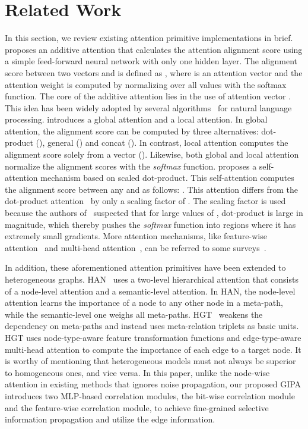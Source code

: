 \documentclass[runningheads]{llncs}
\newcommand{\model}{GIPA\xspace}
\begin{document}
\section{Related Work}
In this section, we review existing attention primitive implementations in brief.
\cite{bahdanau2014neural} proposes an additive attention that calculates the attention alignment score using a simple feed-forward neural network with only one hidden layer.
The alignment score  between two vectors  and  is defined as
, 
where  is an attention vector and the attention weight  is computed by normalizing  over all  values with the softmax function.
The core of the additive attention lies in the use of attention vector .
This idea has been widely adopted by several algorithms~\cite{yang2016hierarchical,pavlopoulos2017deeper} for natural language processing.
\cite{luong2015effective} introduces a global attention and a local attention.
In global attention, the alignment score can be computed by three alternatives: dot-product (), general () and concat ().
In contrast, local attention computes the alignment score solely from a vector ().
Likewise, both global and local attention normalize the alignment scores with the \textit{softmax} function.
\cite{vaswani2017attention} proposes a self-attention mechanism based on scaled dot-product.
This self-attention computes the alignment score between any  and  as follows: 
. 
This attention differs from the dot-product attention~\cite{luong2015effective} by only a scaling factor of .
The scaling factor is used because the authors of~\cite{vaswani2017attention} suspected that for large values of , dot-product is large in magnitude, which thereby pushes the \textit{softmax} function into regions where it has extremely small gradients.
More attention mechanisms, like feature-wise attention~\cite{FeatureAtt} and multi-head attention~\cite{vaswani2017attention}, can be referred to some surveys~\cite{attsurvey,NIU202148}.


In addition, these aforementioned attention primitives have been extended to heterogeneous graphs.
HAN~\cite{wang2019heterogeneous} uses a two-level hierarchical attention that consists of a node-level attention and a semantic-level attention.
In HAN, the node-level attention learns the importance of a node to any other node in a meta-path, while the semantic-level one weighs all meta-paths.
HGT~\cite{zhang2019heterogeneous} weakens the dependency on meta-paths and instead uses meta-relation triplets as basic units.
HGT uses node-type-aware feature transformation functions and edge-type-aware multi-head attention to compute the importance of each edge to a target node.
It is worthy of mentioning that heterogeneous models must not always be superior to homogeneous ones, and vice versa. In this paper, unlike the node-wise attention in existing methods that ignores noise propagation, our proposed \model introduces two MLP-based correlation modules, the bit-wise correlation module and the feature-wise correlation module, to achieve fine-grained selective information propagation and utilize the edge information.
\end{document}
